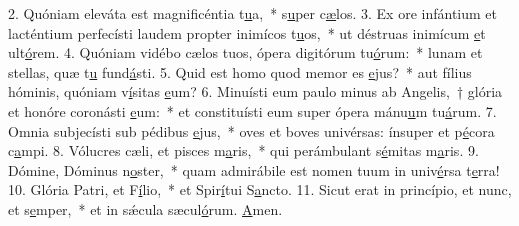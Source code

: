 2. Quóniam eleváta est magnificéntia t\uline{u}a,~* s\uline{u}per c\uline{æ}los.
3. Ex ore infántium et lacténtium perfecísti laudem propter inimícos t\uline{u}os,~* ut déstruas inimícum \uline{e}t ult\uline{ó}rem.
4. Quóniam vidébo cælos tuos, ópera digitórum tu\uline{ó}rum:~* lunam et stellas, quæ t\uline{u} fund\uline{á}sti.
5. Quid est homo quod memor es \uline{e}jus?~* aut fílius hóminis, quóniam v\uline{í}sitas \uline{e}um?
6. Minuísti eum paulo minus ab Angelis,~† glória et honóre coronásti \uline{e}um:~* et constituísti eum super ópera mánu\uline{u}m tu\uline{á}rum.
7. Omnia subjecísti sub pédibus \uline{e}jus,~* oves et boves univérsas: ínsuper et p\uline{é}cora c\uline{a}mpi.
8. Vólucres cæli, et pisces m\uline{a}ris,~* qui perámbulant s\uline{é}mitas m\uline{a}ris.
9. Dómine, Dóminus n\uline{o}ster,~* quam admirábile est nomen tuum in univ\uline{é}rsa t\uline{e}rra!
10. Glória Patri, et F\uline{í}lio,~* et Spir\uline{í}tui S\uline{a}ncto.
11. Sicut erat in princípio, et nunc, et s\uline{e}mper,~* et in sǽcula sæcul\uline{ó}rum. \uline{A}men.
